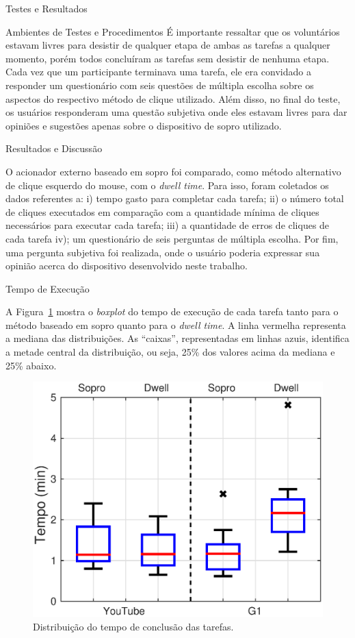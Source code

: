 \begin{chapter}{Testes e Resultados}
\begin{section}{Ambientes de Testes e Procedimentos}
É importante ressaltar que os voluntários estavam livres para desistir de
qualquer etapa de ambas as tarefas a qualquer momento, porém todos concluíram as
tarefas sem desistir de nenhuma etapa. Cada vez que um participante terminava
uma tarefa, ele era convidado a responder um questionário com seis questões de
múltipla escolha sobre os aspectos do respectivo método de clique utilizado.
Além disso, no final do teste, os usuários responderam uma questão subjetiva
onde eles estavam livres para dar opiniões e sugestões apenas sobre o dispositivo
de sopro utilizado.
\end{section}

\begin{section}{Resultados e Discussão}

O acionador externo baseado em sopro foi comparado, como
método alternativo de clique esquerdo do mouse, com o \textit{dwell time}. Para
isso, foram coletados os dados referentes a: i) tempo gasto para completar cada
tarefa; ii) o número total de cliques executados em comparação com a quantidade
mínima de cliques necessários para executar cada tarefa; iii) a quantidade de
erros de cliques de cada tarefa iv); um questionário de seis perguntas de
múltipla escolha. Por fim, uma pergunta subjetiva foi realizada, onde o usuário
poderia expressar sua opinião acerca do dispositivo desenvolvido neste trabalho.

\begin{subsection}{Tempo de Execução}

A Figura~\ref{fig:tempo} mostra o \textit{boxplot} do tempo de execução de cada
tarefa tanto para o método baseado em sopro quanto para o \textit{dwell time}. A
linha vermelha representa a mediana das distribuições. As ``caixas'',
representadas em linhas azuis, identifica a metade central da distribuição, ou
seja, 25\% dos valores acima da mediana e 25\% abaixo.

\begin{figure}[!h]
	\centering
	\includegraphics[width=.65\linewidth]{fig/time}
	\caption{Distribuição do tempo de conclusão das tarefas.}
	\label{fig:tempo}
\end{figure}


\end{subsection}
\end{section}
\end{chapter}
